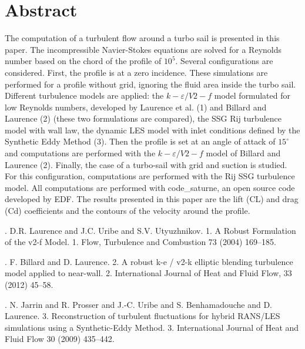 \documentclass[article, A4, 11pt]{llncs}%
\begin{document}
\section*{Abstract}
The computation of a turbulent flow around a turbo sail is presented in this paper.  The incompressible Navier-Stokes equations are solved for a Reynolds number based on the chord of the profile of $10^5$.
Several configurations are considered. First, the profile is at a zero incidence. These simulations are performed for a profile without grid, ignoring the fluid area inside the turbo sail. Different turbulence models are applied: 
the $k-\varepsilon/V2-f$ model formulated for low Reynolds numbers, developed by Laurence et al. (1) and Billard and Laurence (2) (these two formulations are compared), 
the SSG Rij turbulence model with wall law,
the dynamic LES model with inlet conditions defined by the Synthetic Eddy Method (3).
Then the profile is set at an angle of attack of $15^\circ$ and computations are performed with the $k-\varepsilon/V2-f$ model of Billard and Laurence (2). Finally, the case of a turbo-sail with grid and suction is studied. For this configuration, computations are performed with the Rij SSG turbulence model.
All computations are performed with code\_saturne, an open source code developed by EDF. The results presented in this paper are the lift (CL) and drag (Cd) coefficients and the contours of the velocity around the profile. 


\begin{thebibliography}{10}
{. D.R. Laurence and J.C. Uribe and S.V. Utyuzhnikov}. {1. A Robust Formulation of the v2-f Model}. 1. Flow, Turbulence and Combustion 73 (2004) 169–185.

{. F. Billard and D. Laurence}. {2. A robust k-e / v2-k elliptic blending turbulence model applied to near-wall}. 2. International Journal of Heat and Fluid Flow, 33 (2012) 45–58.

{. N. Jarrin and R. Prosser and J.-C. Uribe and S. Benhamadouche and D. Laurence}. {3. Reconstruction of turbulent fluctuations for hybrid RANS/LES simulations using a Synthetic-Eddy Method}. 3.  International Journal of Heat and Fluid Flow 30 (2009) 435–442.
\end{thebibliography} %
\end{document}
